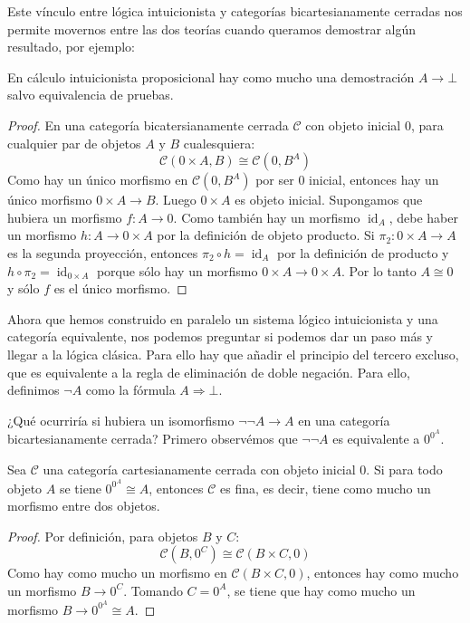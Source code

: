 \documentclass[12pt, twoside]{book}
\newcommand{\cat}{{\mathcal{C}}}
\DeclareMathOperator{\id}{id}
\begin{document}
Este vínculo entre lógica intuicionista y categorías bicartesianamente cerradas nos permite movernos entre las dos teorías cuando queramos demostrar algún resultado, por ejemplo:
\begin{lemma}
En cálculo intuicionista proposicional hay como mucho una demostración $A \to \bot$ salvo equivalencia de pruebas.
\end{lemma}
\begin{proof}
En una categoría bicatersianamente cerrada $\cat$ con objeto inicial $0$, para cualquier par de objetos $A$ y $B$ cualesquiera:
\[ \cat(0 \times A, B) \cong \cat(0, B^A) \]
Como hay un único morfismo en $\cat(0, B^A)$ por ser $0$ inicial, entonces hay un único morfismo $0 \times A \to B$.
Luego $0 \times A$ es objeto inicial.
Supongamos que hubiera un morfismo $f \colon A \to 0$.
Como también hay un morfismo $\id_A$, debe haber un morfismo $h \colon A \to 0 \times A$ por la definición de objeto producto.
Si $\pi_2 \colon 0 \times A \to A$ es la segunda proyección, entonces $\pi_2 \circ h = \id_A$ por la definición de producto y $h \circ \pi_2 = \id_{0 \times A}$ porque sólo hay un morfismo $0 \times A \to 0 \times A$.
Por lo tanto $A \cong 0$ y sólo $f$ es el único morfismo.
\end{proof}

Ahora que hemos construido en paralelo un sistema lógico intuicionista y una categoría equivalente, nos podemos preguntar si podemos dar un paso más y llegar a la lógica clásica.
Para ello hay que añadir el principio del tercero excluso, que es equivalente a la regla de eliminación de doble negación.
Para ello, definimos $\neg A$ como la fórmula $A \Rightarrow \bot$.
\begin{prooftree}
\end{prooftree}
¿Qué ocurriría si hubiera un isomorfismo $\neg \neg A \to A$ en una categoría bicartesianamente cerrada?
Primero observémos que $\neg \neg A$ es equivalente a $0^{0^A}$.

\begin{theorem}
Sea $\cat$ una categoría cartesianamente cerrada con objeto inicial $0$.
Si para todo objeto $A$ se tiene $0^{0^A} \cong A$, entonces $\cat$ es fina, es decir, tiene como mucho un morfismo entre dos objetos.
\end{theorem}
\begin{proof}
Por definición, para objetos $B$ y $C$:
\[ \cat(B, 0^C) \cong \cat(B \times C, 0) \]
Como hay como mucho un morfismo en $\cat(B \times C, 0)$, entonces hay como mucho un morfismo $B \to 0^C$.
Tomando $C = 0^A$, se tiene que hay como mucho un morfismo $B \to 0^{0^A} \cong A$.
\end{proof}
\end{document}

